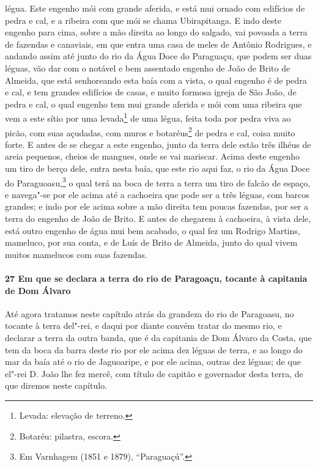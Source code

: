 légua. Este engenho mói com grande aferida, e está mui ornado com edifícios de pedra e
cal, e a ribeira com que mói se chama Ubirapitanga. E indo deste engenho para cima, sobre
a mão direita ao longo do salgado, vai povoada a terra de fazendas e canaviais, em que
entra uma casa de meles de Antônio Rodrigues, e andando assim até junto do rio da Água
Doce do Paraguaçu, que podem ser duas léguas, vão dar com o notável e bem assentado
engenho de João de Brito de Almeida, que está senhoreando esta baía com a vista, o qual
engenho é de pedra e cal, e tem grandes edifícios de casas, e muito formosa igreja de São
João, de pedra e cal, o qual engenho tem mui grande aferida e mói com uma ribeira que vem
a este sítio por uma levada\footnote{ Levada: elevação de terreno.} de uma légua, feita
toda por pedra viva ao picão, com suas açudadas, com muros e botaréus\footnote{ Botaréu:
pilastra, escora.} de pedra e cal, coisa muito forte. E antes de se chegar a este engenho,
junto da terra dele estão três ilhéus de areia pequenos, cheios de mangues, onde se vai
mariscar. Acima deste engenho um tiro de berço dele, entra nesta baía, que este rio aqui
faz, o rio da Água Doce do Paraguoasu,\footnote{ Em Varnhagem (1851 e 1879),
``Paraguaçú''.} o qual terá na boca de terra a terra um tiro de falcão de espaço, e
navega"-se por ele acima até a cachoeira que pode ser a três léguas, com barcos grandes; e
indo por ele acima sobre a mão direita tem poucas fazendas, por ser a terra do engenho de
João de Brito. E antes de chegarem à cachoeira, à vista dele, está outro engenho de água
mui bem acabado, o qual fez um Rodrigo Martins, mameluco, por sua conta, e de Luís de
Brito de Almeida, junto do qual vivem muitos mamelucos com suas fazendas.

\paragraph{27 Em que se declara a terra do rio de Paragoaçu, tocante à capitania de Dom
Álvaro}

Até agora tratamos neste capítulo atrás da grandeza do rio de Paragoasu, no tocante à
terra del"-rei, e daqui por diante convém tratar do mesmo rio, e declarar a terra da outra
banda, que é da capitania de Dom Álvaro da Costa, que tem da boca da barra deste rio por
ele acima dez léguas de terra, e ao longo do mar da baía até o rio de Jaguoaripe, e por
ele acima, outras dez léguas; de que el"-rei D. João lhe fez mercê, com título de capitão e
governador desta terra, de que diremos neste capítulo.

